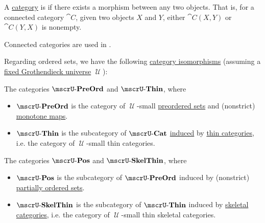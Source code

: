 \begin{definition}\label{def:connected_category}
  A \hyperref[def:category]{category} is  if there exists a morphism between any two objects. That is, for a connected category \( \cat{C} \), given two objects \( X \) and \( Y \), either \( \cat{C}(X, Y) \) or \( \cat{C}(Y, X) \) is nonempty.

  Connected categories are used in .
\end{definition}

\begin{theorem}\label{thm:order_category_isomorphism}
  Regarding ordered sets, we have the following \hyperref[rem:category_similarity/isomorphism]{category isomorphisms} (assuming a \hyperref[def:category_size]{fixed Grothendieck universe} \( \mscrU \)):
  \begin{thmenum}
     The categories \hyperref[def:preordered_set/category]{\( \ucat{PreOrd} \)} and \( \ucat{Thin} \), where
    \begin{itemize}
      \item \( \ucat{PreOrd} \) is the category of \( \mscrU \)-small \hyperref[def:preordered_set]{preordered sets} and (nonstrict) \hyperref[def:preordered_set/homomorphism]{monotone maps}.

      \item \( \ucat{Thin} \) is the subcategory of \hyperref[def:category_of_small_categories]{\( \ucat{Cat} \)} \hyperref[def:subcategory]{induced} by \hyperref[def:thin_category]{thin categories}, i.e. the category of \( \mscrU \)-small thin categories.
    \end{itemize}

     The categories \hyperref[def:partially_ordered_set/category]{\( \ucat{Pos} \)} and \( \ucat{SkelThin} \), where
    \begin{itemize}
      \item \( \ucat{Pos} \) is the subcategory of \( \ucat{PreOrd} \) induced by (nonstrict) \hyperref[def:partially_ordered_set]{partially ordered sets}.

      \item \( \ucat{SkelThin} \) is the subcategory of \( \ucat{Thin} \) induced by \hyperref[def:skeletal_category]{skeletal categories}, i.e. the category of \( \mscrU \)-small thin skeletal categories.
    \end{itemize}


\end{thmenum}
\end{theorem}
